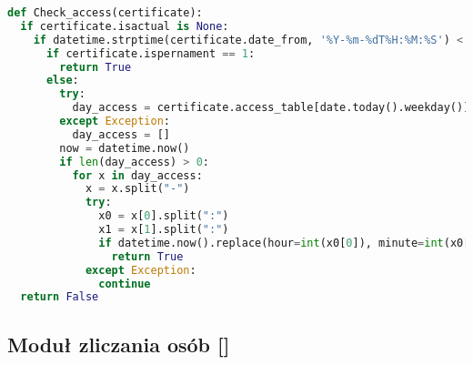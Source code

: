 {\footnotesize 
	\begin{lstlisting}[caption={Funkcja Check-access urządzenia sterującego}, label={lst:RPI check access}, language=Python]
def Check_access(certificate):
  if certificate.isactual is None:
    if datetime.strptime(certificate.date_from, '%Y-%m-%dT%H:%M:%S') < datetime.now() < datetime.strptime( certificate.date_to, '%Y-%m-%dT%H:%M:%S'):
      if certificate.ispernament == 1:
        return True
      else:
        try:
          day_access = certificate.access_table[date.today().weekday()].split(";")
        except Exception:
          day_access = []
        now = datetime.now()
        if len(day_access) > 0:
          for x in day_access:
            x = x.split("-")
            try:
              x0 = x[0].split(":")
              x1 = x[1].split(":")
              if datetime.now().replace(hour=int(x0[0]), minute=int(x0[1])) <= now < datetime.now().replace(hour=int(x1[0]), minute=int(x1[1])):
                return True
            except Exception:
              continue
  return False
	\end{lstlisting}}

\subsection{Moduł zliczania osób [\StudentA]}


 
